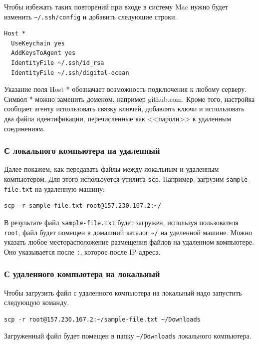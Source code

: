 \documentclass[12pt]{article}
\begin{document}
Чтобы избежать таких повторений при входе в систему Mac нужно будет
изменить \texttt{\textasciitilde{}/.ssh/config} и добавить следующие
строки.
\begin{verbatim}
Host *
  UseKeychain yes
  AddKeysToAgent yes
  IdentityFile ~/.ssh/id_rsa
  IdentityFile ~/.ssh/digital-ocean
\end{verbatim}
Указание поля Host * обозначает возможность подключения к любому
серверу. Символ * можно заменить доменом, например github.com. Кроме
того, настройка сообщает агенту использовать связку ключей, добавлять
ключи и использовать два файла идентификации, перечисленные как <<пароли>>
к удаленным соединениям.

\hypertarget{From-local-computer-to-remote-machine}{%
\subsubsection{\texorpdfstring{\protect\hyperlink{From-local-computer-to-remote-machine}{}С
локального компьютера на
удаленный}{С локального компьютера на удаленный}}\label{From-local-computer-to-remote-machine}}

Далее покажем, как передавать файлы между локальным и удаленным
компьютером. Для этого используется утилита \texttt{scp}.
Например, загрузим \texttt{sample-file.txt} на удаленную машину:
\begin{verbatim}
scp -r sample-file.txt root@157.230.167.2:~/
\end{verbatim}
В результате файл \texttt{sample-file.txt} будет загружен, используя
пользователя \texttt{root}, файл будет помещен в домашний каталог
\texttt{\textasciitilde{}/} на уделенной машине. Можно указать любое
месторасположение размещения файлов на удаленном компьютере. Оно
указывается после \texttt{:}, которое после IP-адреса.

\hypertarget{From-remote-machine-to-local-computer}{%
\subsubsection{\texorpdfstring{\protect\hyperlink{From-remote-machine-to-local-computer}{}С
удаленного компьютера на
локальный}{С удаленного компьютера на локальный}}\label{From-remote-machine-to-local-computer}}

Чтобы загрузить файл с удаленного компьютера на локальный надо запустить
следующую команду.
\begin{verbatim}
scp -r root@157.230.167.2:~/sample-file.txt ~/Downloads
\end{verbatim}
Загруженный файл будет помещен в папку
\texttt{\textasciitilde{}/Downloads} локального компьютера.
\end{document}
